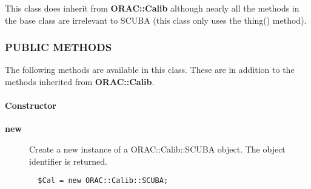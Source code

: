 This class does inherit from \textbf{ORAC::Calib} although nearly all the
methods in the base class are irrelevant to SCUBA (this class only
uses the thing() method).

\subsubsection*{PUBLIC METHODS\label{ORAC::Calib::SCUBA_PUBLIC_METHODS}}


The following methods are available in this class.
These are in addition to the methods inherited from \textbf{ORAC::Calib}.

\paragraph*{Constructor\label{ORAC::Calib::SCUBA_Constructor}}
\begin{description}

\item[{\textbf{new}}] \mbox{}

Create a new instance of a ORAC::Calib::SCUBA object.
The object identifier is returned.

\begin{verbatim}
  $Cal = new ORAC::Calib::SCUBA;
\end{verbatim}
\end{description}
